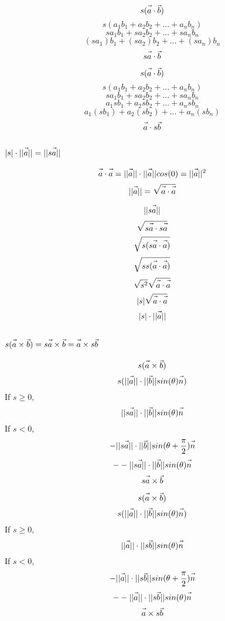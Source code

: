 \documentclass{article}
\newcommand{\fvec}[1]{\vec{\vphantom{A}#1}}
\begin{document}
\noindent\begin{minipage}{.5\linewidth}
$$ s(\fvec{a} \cdot \fvec{b}) $$
$$ s(a_1 b_1 + a_2 b_2 + ... + a_n b_n) $$
$$ s a_1 b_1 + s a_2 b_2 + ... + s a_n b_n $$
$$ (s a_1) b_1 + (s a_2) b_2 + ... + (s a_n) b_n $$
$$ s\fvec{a} \cdot \fvec{b} $$
\end{minipage}%
\hfill
\begin{minipage}{.5\linewidth}
$$ s(\fvec{a} \cdot \fvec{b}) $$
$$ s(a_1 b_1 + a_2 b_2 + ... + a_n b_n) $$
$$ s a_1 b_1 + s a_2 b_2 + ... + s a_n b_n $$
$$ a_1 s b_1 + a_2 s b_2 + ... + a_n s b_n $$
$$ a_1 (s b_1) + a_2 (s b_2) + ... + a_n (s b_n) $$
$$ \fvec{a} \cdot s\fvec{b} $$
\end{minipage}%

\subsection{$ |s| \cdot ||\fvec{a}|| = ||s\fvec{a}|| $}
$$ \fvec{a} \cdot \fvec{a} = ||\fvec{a}|| \cdot ||\fvec{a}|| cos(0) = ||\fvec{a}||^2 $$
$$ ||\fvec{a}|| = \sqrt{\fvec{a} \cdot \fvec{a}} $$

$$ ||s\fvec{a}|| $$
$$ \sqrt{s\fvec{a} \cdot s\fvec{a}} $$
$$ \sqrt{s(s\fvec{a} \cdot \fvec{a})} $$
$$ \sqrt{ss(\fvec{a} \cdot \fvec{a})} $$
$$ \sqrt{s^2}\sqrt{\fvec{a} \cdot \fvec{a}} $$
$$ |s|\sqrt{\fvec{a} \cdot \fvec{a}} $$
$$ |s| \cdot ||\fvec{a}|| $$

\subsection{$ s(\fvec{a} \times \fvec{b}) = s\fvec{a} \times \fvec{b} = \fvec{a} \times s\fvec{b} $}
\noindent\begin{minipage}{.5\linewidth}
$$ s(\fvec{a} \times \fvec{b}) $$
$$ s(||\fvec{a}|| \cdot ||\fvec{b}|| sin(\theta) \fvec{n}) $$
If $ s \ge 0 $, 
$$ ||s\fvec{a}|| \cdot ||\fvec{b}|| sin(\theta) \fvec{n} $$
If $ s < 0 $, 
$$ -||s\fvec{a}|| \cdot ||\fvec{b}|| sin(\theta + \frac{\pi}{2}) \fvec{n} $$
$$ --||s\fvec{a}|| \cdot ||\fvec{b}|| sin(\theta) \fvec{n} $$
$$ s\fvec{a} \times \fvec{b} $$
\end{minipage}%
\hfill
\begin{minipage}{.5\linewidth}
$$ s(\fvec{a} \times \fvec{b}) $$
$$ s(||\fvec{a}|| \cdot ||\fvec{b}|| sin(\theta) \fvec{n}) $$
If $ s \ge 0 $, 
$$ ||\fvec{a}|| \cdot ||s\fvec{b}|| sin(\theta) \fvec{n} $$
If $ s < 0 $, 
$$ -||\fvec{a}|| \cdot ||s\fvec{b}|| sin(\theta + \frac{\pi}{2}) \fvec{n} $$
$$ --||\fvec{a}|| \cdot ||s\fvec{b}|| sin(\theta) \fvec{n} $$
$$ \fvec{a} \times s\fvec{b} $$
\end{minipage}%
\end{document}

